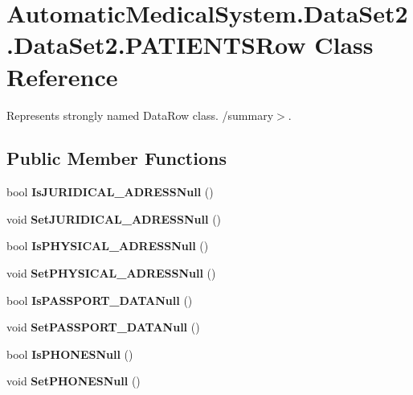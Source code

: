 \section{AutomaticMedicalSystem.DataSet2.DataSet2.PATIENTSRow Class Reference}
\label{class_automatic_medical_system_1_1_data_set2_1_1_p_a_t_i_e_n_t_s_row}
Represents strongly named DataRow class. /summary$>$.  


\subsection*{Public Member Functions}
\begin{CompactItemize}
\item 
bool \textbf{IsJURIDICAL\_\-ADRESSNull} ()\label{class_automatic_medical_system_1_1_data_set2_1_1_p_a_t_i_e_n_t_s_row_d7ba4d3afc55d1fff487e94a114111e1}

\item 
void \textbf{SetJURIDICAL\_\-ADRESSNull} ()\label{class_automatic_medical_system_1_1_data_set2_1_1_p_a_t_i_e_n_t_s_row_e7924c6c8ea980c8e61e36b8ac72a938}

\item 
bool \textbf{IsPHYSICAL\_\-ADRESSNull} ()\label{class_automatic_medical_system_1_1_data_set2_1_1_p_a_t_i_e_n_t_s_row_20d8951728f34e2b6bfec7db1d1f7589}

\item 
void \textbf{SetPHYSICAL\_\-ADRESSNull} ()\label{class_automatic_medical_system_1_1_data_set2_1_1_p_a_t_i_e_n_t_s_row_3d497069f5d650749304d8dce75a6593}

\item 
bool \textbf{IsPASSPORT\_\-DATANull} ()\label{class_automatic_medical_system_1_1_data_set2_1_1_p_a_t_i_e_n_t_s_row_8493683df6283f38ef1d3f9f0c840086}

\item 
void \textbf{SetPASSPORT\_\-DATANull} ()\label{class_automatic_medical_system_1_1_data_set2_1_1_p_a_t_i_e_n_t_s_row_9dd9948e3315b39a83cbdb7ad8fa314c}

\item 
bool \textbf{IsPHONESNull} ()\label{class_automatic_medical_system_1_1_data_set2_1_1_p_a_t_i_e_n_t_s_row_776f413df97d5f914c0bf92ff245545f}

\item 
void \textbf{SetPHONESNull} ()\label{class_automatic_medical_system_1_1_data_set2_1_1_p_a_t_i_e_n_t_s_row_1c957ae19478d779d400e99d40c07b67}


\end{CompactItemize}
